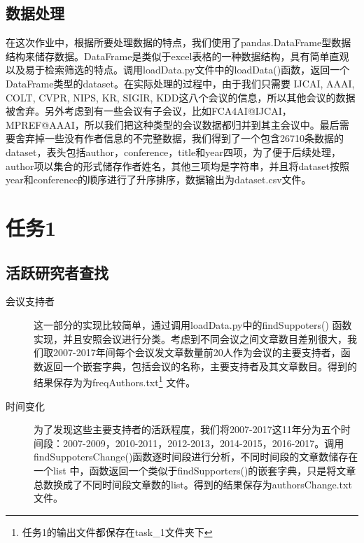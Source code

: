 \documentclass[a4paper,oneside,12pt]{article}
\begin{document}
\begin{spacing}{1.5}
\subsection{数据处理}
在这次作业中，根据所要处理数据的特点，我们使用了pandas.DataFrame型数据结构来储存数据。DataFrame是类似于excel表格的一种数据结构，具有简单直观以及易于检索筛选的特点。调用loadData.py文件中的loadData()函数，返回一个DataFrame类型的dataset。在实际处理的过程中，由于我们只需要 IJCAI, AAAI, COLT, CVPR, NIPS, KR, SIGIR,
KDD这八个会议的信息，所以其他会议的数据被舍弃。另外考虑到有一些会议有子会议，比如FCA4AI@IJCAI，MPREF@AAAI，所以我们把这种类型的会议数据都归并到其主会议中。最后需要舍弃掉一些没有作者信息的不完整数据，我们得到了一个包含26710条数据的dataset，表头包括author，conference，title和year四项，为了便于后续处理，author项以集合的形式储存作者姓名，其他三项均是字符串，并且将dataset按照year和conference的顺序进行了升序排序，数据输出为dataset.csv文件。\par



\section{任务1}
\subsection{活跃研究者查找}
\begin{description}
  \item[会议支持者] 这一部分的实现比较简单，通过调用loadData.py中的findSuppoters() 函数实现，并且安照会议进行分类。考虑到不同会议之间文章数目差别很大，我们取2007-2017年间每个会议发文章数量前20人作为会议的主要支持者，函数返回一个嵌套字典，包括会议的名称，主要支持者及其文章数目。得到的结果保存为为freqAuthors.txt\footnote{任务1的输出文件都保存在task\_1文件夹下} 文件。
  \item[时间变化] 为了发现这些主要支持者的活跃程度，我们将2007-2017这11年分为五个时间段：2007-2009，2010-2011，2012-2013，2014-2015，2016-2017。调用findSuppotersChange()函数逐时间段进行分析，不同时间段的文章数储存在一个list 中，函数返回一个类似于findSupporters()的嵌套字典，只是将文章总数换成了不同时间段文章数的list。得到的结果保存为authorsChange.txt 文件。
\end{description}



\end{spacing}
\end{document}
